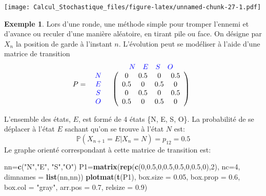 \documentclass[
]{book}
\newenvironment{Shaded}{\begin{snugshade}}{\end{snugshade}}
\newcommand{\DataTypeTok}[1]{\textcolor[rgb]{0.13,0.29,0.53}{#1}}
\newcommand{\DecValTok}[1]{\textcolor[rgb]{0.00,0.00,0.81}{#1}}
\newcommand{\FloatTok}[1]{\textcolor[rgb]{0.00,0.00,0.81}{#1}}
\newcommand{\KeywordTok}[1]{\textcolor[rgb]{0.13,0.29,0.53}{\textbf{#1}}}
\newcommand{\NormalTok}[1]{#1}
\newcommand{\StringTok}[1]{\textcolor[rgb]{0.31,0.60,0.02}{#1}}
\theoremstyle{definition}
\theoremstyle{definition}
\newtheorem{example}{Exemple}[chapter]
\theoremstyle{definition}
\theoremstyle{remark}
\begin{document}
\texttt{[image: Calcul\_Stochastique\_files/figure-latex/unnamed-chunk-27-1.pdf]}

\begin{example}
\protect\hypertarget{exm:unnamed-chunk-28}{}{\label{exm:unnamed-chunk-28} }Lors d'une ronde, une méthode simple pour tromper l'ennemi et d'avance ou reculer d'une manière aléatoire, en tirant pile ou face. On désigne par \(X_n\) la position de garde à l'instant \(n\). L'évolution peut se modéliser à l'aide d'une matrice de transition
\[
 P=\begin{array}{c c} &
\begin{array}{c c c c} \color{blue}{N} & \color{blue}{E} & \color{blue}{S} & \color{blue}{O} \\
\end{array}
\\
\begin{array}{c c c c}
\color{blue}{N} \\
\color{blue}{E}\\
\color{blue}{S} \\
\color{blue}{O}
\end{array}
&
\left(
\begin{array}{c c c c}
0 & 0.5 & 0 & 0.5 \\
0.5 & 0 & 0.5 & 0 \\
0 & 0.5 & 0 & 0.5 \\
0.5 & 0 & 0.5 & 0
\end{array}
\right)
\end{array}\]
\end{example}

L'ensemble des états, \(E\), est formé de 4 états \{N, E, S, O\}. La probabilité de se déplacer à l'état \(E\) sachant qu'on se trouve à l'état \(N\) est:
\[
\mathbb{P}(X_{n+1}=E|X_n=N)=p_{12}=0.5
\]
Le graphe orienté correspondant à cette matrice de transition est:

\begin{Shaded}
\begin{Highlighting}[]
\NormalTok{nn=}\KeywordTok{c}\NormalTok{(}\StringTok{"N"}\NormalTok{,}\StringTok{"E"}\NormalTok{, }\StringTok{"S"}\NormalTok{,}\StringTok{"O"}\NormalTok{)}
\NormalTok{P1=}\KeywordTok{matrix}\NormalTok{(}\KeywordTok{rep}\NormalTok{(}\KeywordTok{c}\NormalTok{(}\DecValTok{0}\NormalTok{,}\FloatTok{0.5}\NormalTok{,}\DecValTok{0}\NormalTok{,}\FloatTok{0.5}\NormalTok{,}\FloatTok{0.5}\NormalTok{,}\DecValTok{0}\NormalTok{,}\FloatTok{0.5}\NormalTok{,}\DecValTok{0}\NormalTok{),}\DecValTok{2}\NormalTok{), }\DataTypeTok{nc=}\DecValTok{4}\NormalTok{,}
          \DataTypeTok{dimnames =} \KeywordTok{list}\NormalTok{(nn,nn))}
\KeywordTok{plotmat}\NormalTok{(}\KeywordTok{t}\NormalTok{(P1), }\DataTypeTok{box.size =} \FloatTok{0.05}\NormalTok{, }\DataTypeTok{box.prop =} \FloatTok{0.6}\NormalTok{, }\DataTypeTok{box.col =} \StringTok{"gray"}\NormalTok{, }
          \DataTypeTok{arr.pos =} \FloatTok{0.7}\NormalTok{, }\DataTypeTok{relsize =} \FloatTok{0.9}\NormalTok{)}
\end{Highlighting}
\end{Shaded}
\end{document}
